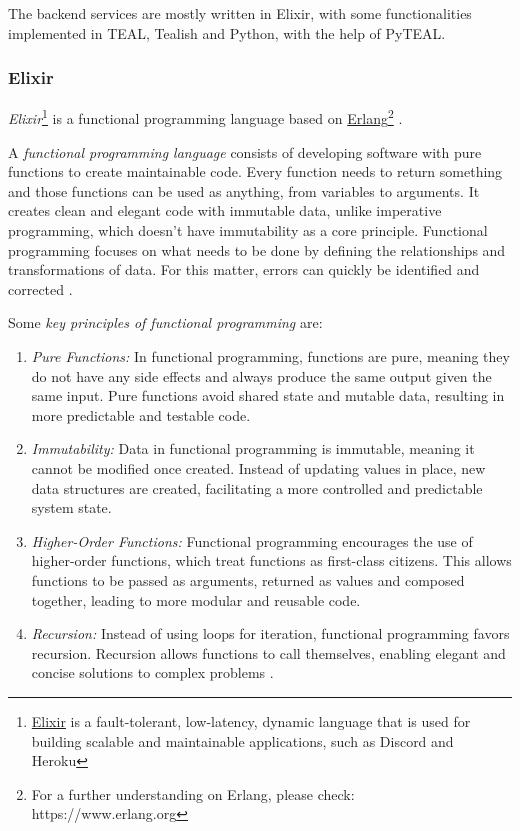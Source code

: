 The backend services are mostly written in Elixir, with some functionalities implemented in TEAL, Tealish and Python, with the help of PyTEAL.

\subsubsection{Elixir}\label{elixir}

\textit{Elixir}\footnote{\href{https://elixir-lang.org}{Elixir} is a fault-tolerant, low-latency, dynamic language that is used for building scalable and maintainable applications, such as Discord and Heroku} is a functional programming language based on \href{https://www.erlang.org}{Erlang}\footnote{For a further understanding on Erlang, please check: https://www.erlang.org} \cite{elixir}. \newline

A \textit{functional programming language} consists of developing software with pure functions to create maintainable code. Every function needs to return something and those functions can be used as anything, from variables to arguments. It creates clean and elegant code with immutable data, unlike imperative programming, which doesn't have immutability as a core principle. Functional programming focuses on what needs to be done by defining the relationships and transformations of data. For this matter, errors can quickly be identified and corrected \cite{func}.\newline

Some \textit{key principles of functional programming} are:

\begin{enumerate}
    \item \textit{Pure Functions:} In functional programming, functions are pure, meaning they do not have any side effects and always produce the same output given the same input. Pure functions avoid shared state and mutable data, resulting in more predictable and testable code.
    \item \textit{Immutability:} Data in functional programming is immutable, meaning it cannot be modified once created. Instead of updating values in place, new data structures are created, facilitating a more controlled and predictable system state.
    \item \textit{Higher-Order Functions:} Functional programming encourages the use of higher-order functions, which treat functions as first-class citizens. This allows functions to be passed as arguments, returned as values and composed together, leading to more modular and reusable code.
    \item \textit{Recursion:} Instead of using loops for iteration, functional programming favors recursion. Recursion allows functions to call themselves, enabling elegant and concise solutions to complex problems \cite{func}.
\end{enumerate}


